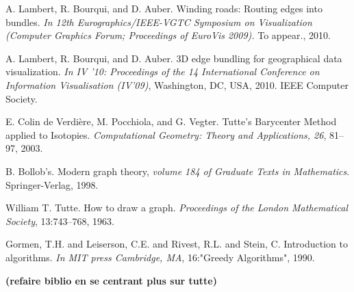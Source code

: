 \begin{thebibliography}{}

 A. Lambert, R. Bourqui, and D. Auber. Winding roads: Routing edges
into bundles. \emph{In 12th Eurographics/IEEE-VGTC Symposium on
Visualization (Computer Graphics Forum; Proceedings of EuroVis
2009).} To appear., 2010.

 A. Lambert, R. Bourqui, and D. Auber. 3D edge bundling for
geographical data visualization. \emph{In IV ’10: Proceedings of the 14
International Conference on Information Visualisation (IV’09)},
Washington, DC, USA, 2010. IEEE Computer Society.

 E. Colin de Verdière, M. Pocchiola, and G. Vegter. Tutte's Barycenter Method applied to Isotopies. \emph{Computational Geometry: Theory and Applications, 26}, 81–97, 2003.

 B. Bollob's. Modern graph theory, \emph{volume 184 of Graduate Texts in Mathematics}. Springer-Verlag, 1998.

 William T. Tutte. How to draw a graph. \emph{Proceedings of the London Mathematical Society}, 13:743–768, 1963.

 Gormen, T.H. and Leiserson, C.E. and Rivest, R.L. and Stein, C. Introduction to algorithms. \emph{In MIT press Cambridge, MA}, 16:"Greedy Algorithms", 1990.

\textbf{(refaire biblio en se centrant plus sur tutte)}






   
\end{thebibliography}
